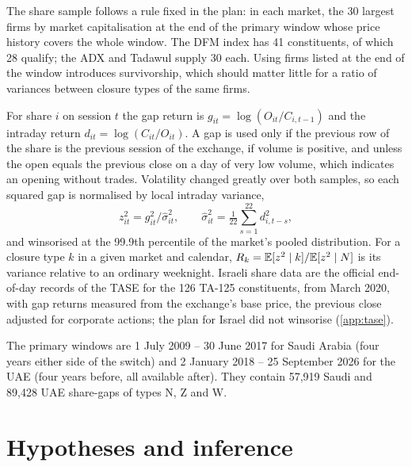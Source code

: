 The share sample follows a rule fixed in the plan: in each market, the 30 largest firms by market capitalisation at the end of the primary window whose price history covers the whole window. The DFM index has 41 constituents, of which 28 qualify; the ADX and Tadawul supply 30 each. Using firms listed at the end of the window introduces survivorship, which should matter little for a ratio of variances between closure types of the same firms.

For share $i$ on session $t$ the gap return is $g_{it}=\log(O_{it}/C_{i,t-1})$ and the intraday return $d_{it}=\log(C_{it}/O_{it})$. A gap is used only if the previous row of the share is the previous session of the exchange, if volume is positive, and unless the open equals the previous close on a day of very low volume, which indicates an opening without trades. Volatility changed greatly over both samples, so each squared gap is normalised by local intraday variance,
\[
z_{it}^2=g_{it}^2/\hat\sigma_{it}^2,\qquad \hat\sigma_{it}^2=\tfrac1{22}\textstyle\sum_{s=1}^{22} d_{i,t-s}^2 ,
\]
and winsorised at the 99.9th percentile of the market's pooled distribution. For a closure type $k$ in a given market and calendar, $R_k=\mathbb{E}[z^2\mid k]/\mathbb{E}[z^2\mid N]$ is its variance relative to an ordinary weeknight. Israeli share data are the official end-of-day records of the TASE for the 126 TA-125 constituents, from March 2020, with gap returns measured from the exchange's base price, the previous close adjusted for corporate actions; the plan for Israel did not winsorise (\ref{app:tase}).

The primary windows are 1 July 2009 -- 30 June 2017 for Saudi Arabia (four years either side of the switch) and 2 January 2018 -- 25 September 2026 for the UAE (four years before, all available after). They contain 57,919 Saudi and 89,428 UAE share-gaps of types N, Z and W.


\section{Hypotheses and inference}\label{sec:hyp}

